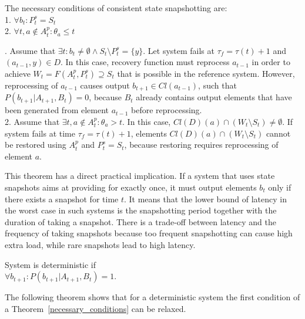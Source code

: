 \begin{theorem}
\label{necessary_conditions}
The necessary conditions of consistent state snapshotting are:\\
1. $\forall{b_t}:P^{s}_t=S_t$\\
2. $\forall{t,a}\notin{A^{p}_t} : \theta_a \leq t$
\end{theorem}
\begin{sketch}
$ $. Assume that $\exists{t}:b_t\neq{\emptyset} \wedge S_{t}\setminus{P^{s}_t}=\{y\}$. Let system fails at $\tau_f = \tau(t)+1$ and $(a_{t-1},y)\in{D}$. In this case, recovery function must reprocess $a_{t-1}$ in order to achieve $W_t=F(A^{p}_t,P^{s}_t)\supseteq{S_t}$ that is possible in the reference system. However, reprocessing of $a_{t-1}$ causes output $b_{t+1}\in{Cl(a_{t-1})}$, such that $P(b_{t+1}|A_{t+1},B_{t})=0$, because $B_{t}$ already contains output elements that have been generated from element $a_{t-1}$ before reprocessing. \\
2. Assume that $\exists{t,a} \notin{A^{p}_t}:\theta_{a}>t$. In this case, $Cl(D)(a) \cap (W_t \setminus{S_t}) \neq \emptyset$. If system fails at time $\tau_f=\tau(t)+1$, elements $Cl(D)(a) \cap (W_t \setminus{S_t})$ cannot be restored using $A^{p}_t$ and $P^{s}_t=S_t$, because restoring requires reprocessing of element $a$.
\end{sketch}

This theorem has a direct practical implication. If a system that uses state snapshots aims at providing for exactly once, it must output elements $b_t$ only if there exists a snapshot for time $t$. It means that the lower bound of latency in the worst case in such systems is the snapshotting period together with the duration of taking a snapshot. There is a trade-off between latency and the frequency of taking snapshots because too frequent snapshotting can cause high extra load, while rare snapshots lead to high latency.

\begin{definition}{System is deterministic}
if\\ 
$\forall{b_{t+1}}:P(b_{t+1}|A_{t+1},B_t)=1$.
\end{definition}

The following theorem shows that for a deterministic system the first condition of a Theorem~\ref{necessary_conditions} can be relaxed. 

